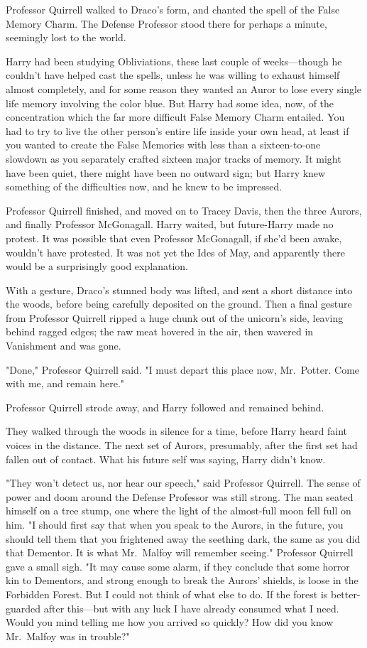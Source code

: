 Professor Quirrell walked to Draco's form, and chanted the spell of the False 
Memory Charm. The Defense Professor stood there for perhaps a minute, seemingly 
lost to the world.

Harry had been studying Obliviations, these last couple of weeks---though he 
couldn't have helped cast the spells, unless he was willing to exhaust himself 
almost completely, and for some reason they wanted an Auror to lose every 
single life memory involving the color blue. But Harry had some idea, now, of 
the concentration which the far more difficult False Memory Charm entailed. You 
had to try to live the other person's entire life inside your own head, at 
least if you wanted to create the False Memories with less than a 
sixteen-to-one slowdown as you separately crafted sixteen major tracks of 
memory. It might have been quiet, there might have been no outward sign; but 
Harry knew something of the difficulties now, and he knew to be impressed.

Professor Quirrell finished, and moved on to Tracey Davis, then the three 
Aurors, and finally Professor McGonagall. Harry waited, but future-Harry made 
no protest. It was possible that even Professor McGonagall, if she'd been 
awake, wouldn't have protested. It was not yet the Ides of May, and apparently 
there would be a surprisingly good explanation.

With a gesture, Draco's stunned body was lifted, and sent a short distance into 
the woods, before being carefully deposited on the ground. Then a final gesture 
from Professor Quirrell ripped a huge chunk out of the unicorn's side, leaving 
behind ragged edges; the raw meat hovered in the air, then wavered in 
Vanishment and was gone.

"Done," Professor Quirrell said. "I must depart this place now, Mr.~Potter. 
Come with me, and remain here."

Professor Quirrell strode away, and Harry followed and remained behind.

They walked through the woods in silence for a time, before Harry heard faint 
voices in the distance. The next set of Aurors, presumably, after the first set 
had fallen out of contact. What his future self was saying, Harry didn't know.

"They won't detect us, nor hear our speech," said Professor Quirrell. The sense 
of power and doom around the Defense Professor was still strong. The man seated 
himself on a tree stump, one where the light of the almost-full moon fell full 
on him. "I should first say that when you speak to the Aurors, in the future, 
you should tell them that you frightened away the seething dark, the same as 
you did that Dementor. It is what Mr.~Malfoy will remember seeing." Professor 
Quirrell gave a small sigh. "It may cause some alarm, if they conclude that 
some horror kin to Dementors, and strong enough to break the Aurors' shields, 
is loose in the Forbidden Forest. But I could not think of what else to do. If 
the forest is better-guarded after this---but with any luck I have already 
consumed what I need. Would you mind telling me how you arrived so quickly? How 
did you know Mr.~Malfoy was in trouble?"

